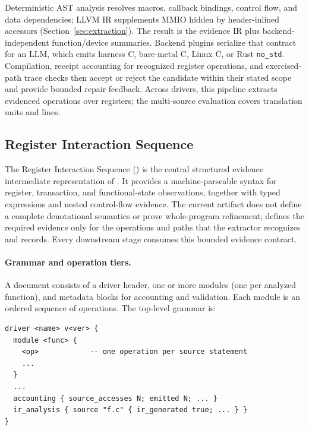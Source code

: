 Deterministic AST analysis resolves macros, callback bindings, control flow, and data dependencies; LLVM IR supplements MMIO hidden by header-inlined accessors (Section~\ref{sec:extraction}). The result is the \rislang{} evidence IR plus backend-independent function/device summaries. Backend plugins serialize that contract for an LLM, which emits harness C, bare-metal C, Linux C, or Rust \texttt{no\_std}. Compilation, receipt accounting for recognized register operations, and exercised-path trace checks then accept or reject the candidate within their stated scope and provide bounded repair feedback. Across \EvalDrivers{} drivers, this pipeline extracts \EvalOps{} evidenced operations over \EvalRegisters{} registers; the multi-source evaluation covers \MultiSourceTUs{} translation units and \MultiSourceLines{} lines.

\subsection{Register Interaction Sequence}
\label{sec:rislang}

The Register Interaction Sequence (\rislang{}) is the central structured evidence
intermediate representation of \reharness{}. It provides a machine-parseable
syntax for register, transaction, and functional-state observations, together
with typed expressions and nested control-flow evidence. The current artifact
does not define a complete denotational semantics or prove whole-program
refinement; \rislang{} defines the required evidence only for the operations
and paths that the extractor recognizes and records. Every downstream stage
consumes this bounded evidence contract.

\paragraph{Grammar and operation tiers.}

A \rislang{} document consists of a driver header, one or more modules (one per analyzed function), and metadata blocks for accounting and validation. Each module is an ordered sequence of operations. The top-level grammar is:

\begin{lstlisting}[language=ris]
driver <name> v<ver> {
  module <func> {
    <op>            -- one operation per source statement
    ...
  }
  ...
  accounting { source_accesses N; emitted N; ... }
  ir_analysis { source "f.c" { ir_generated true; ... } }
}
\end{lstlisting}

